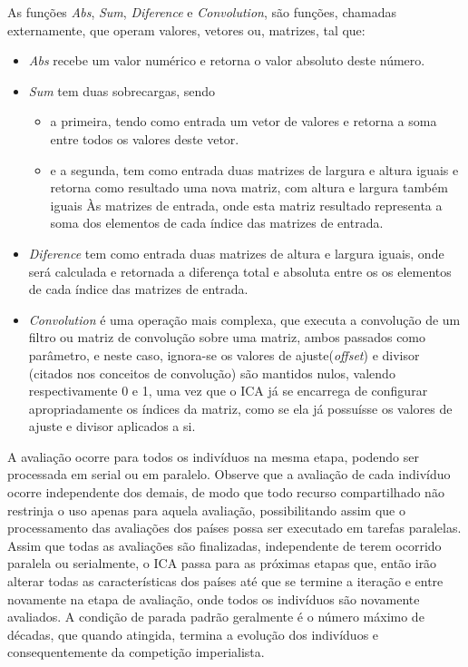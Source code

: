 As funções \emph{Abs}, \emph{Sum}, \emph{Diference} e \emph{Convolution}, são funções, chamadas externamente, que operam valores, vetores ou, matrizes, tal que:
\begin{itemize}
\item \emph{Abs} recebe um valor numérico e retorna o valor absoluto deste número.
\item \emph{Sum} tem duas sobrecargas, sendo
\begin{itemize}
\item a primeira, tendo como entrada um vetor de valores e retorna a soma entre todos os valores deste vetor.
\item e a segunda, tem como entrada duas matrizes de largura e altura iguais e retorna como resultado uma nova matriz, com altura e largura também iguais Às matrizes de entrada, onde esta matriz resultado representa a soma dos elementos de cada índice das matrizes de entrada.
\end{itemize}
\item \emph{Diference} tem como entrada duas matrizes de altura e largura iguais, onde será calculada e retornada a diferença total e absoluta entre os os elementos de cada índice das matrizes de entrada.
\item \emph{Convolution} é uma operação mais complexa, que executa a convolução de um filtro ou matriz de convolução sobre uma matriz, ambos passados como parâmetro, e neste caso, ignora-se os valores de ajuste(\emph{offset}) e divisor (citados nos conceitos de convolução) são mantidos nulos, valendo respectivamente 0 e 1, uma vez que o ICA já se encarrega de configurar apropriadamente os índices da matriz, como se ela já possuísse os valores de ajuste e divisor aplicados a si.
\end{itemize}

A avaliação ocorre para todos os indivíduos na mesma etapa, podendo ser processada em serial ou em paralelo. Observe que a avaliação de cada indivíduo ocorre independente dos demais, de modo que todo recurso compartilhado não restrinja o uso apenas para aquela avaliação, possibilitando assim que o processamento das avaliações dos países possa ser executado em tarefas paralelas. Assim que todas as avaliações são finalizadas, independente de terem ocorrido paralela ou serialmente, o ICA passa para as próximas etapas que, então irão alterar todas as características dos países até que se termine a iteração e entre novamente na etapa de avaliação, onde todos os indivíduos são novamente avaliados. A condição de parada padrão geralmente é o número máximo de décadas, que quando atingida, termina a evolução dos indivíduos e consequentemente da competição imperialista. 



